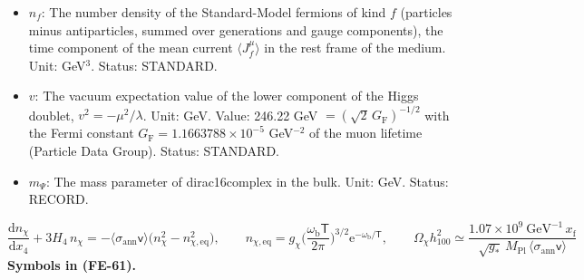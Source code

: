 \documentclass[
  10pt,
]{article}
\begin{document}
\begin{itemize}
  GeV\(^2\) (field strength). Status: AUTHOR.
\item
  \(n_f\): The number density of the Standard-Model fermions of kind
  \(f\) (particles minus antiparticles, summed over generations and
  gauge components), the time component of the mean current
  \(\langle J_f^\mu\rangle\) in the rest frame of the medium. Unit:
  GeV\(^3\). Status: STANDARD.
\item
  \(v\): The vacuum expectation value of the lower component of the
  Higgs doublet, \(v^2 = -\mu^2/\lambda\). Unit: GeV. Value: 246.22 GeV
  \(= (\sqrt2\,G_{\mathrm{F}})^{-1/2}\) with the Fermi constant
  \(G_{\mathrm{F}} = 1.1663788\times10^{-5}\) GeV\(^{-2}\) of the muon
  lifetime (Particle Data Group). Status: STANDARD.
\item
  \(m_\Psi\): The mass parameter of dirac16complex in the bulk. Unit:
  GeV. Status: RECORD.
\end{itemize}

\[
\frac{\mathrm{d}n_\chi}{\mathrm{d}x_4} + 3H_4\,n_\chi = -\langle\sigma_{\mathrm{ann}}\mathsf{v}\rangle\big(n_\chi^2 - n_{\chi,\mathrm{eq}}^2\big),\qquad
n_{\chi,\mathrm{eq}} = g_\chi\Big(\frac{\omega_{\mathrm{b}}\mathsf{T}}{2\pi}\Big)^{3/2}\mathrm{e}^{-\omega_{\mathrm{b}}/\mathsf{T}},\qquad
\Omega_\chi h_{100}^2 \simeq \frac{1.07\times10^9\ \text{GeV}^{-1}\,x_{\mathrm{f}}}{\sqrt{g_*}\,M_{\mathrm{Pl}}\,\langle\sigma_{\mathrm{ann}}\mathsf{v}\rangle} \tag{FE-61}
\] \textbf{Symbols in (FE-61).}
\end{document}
